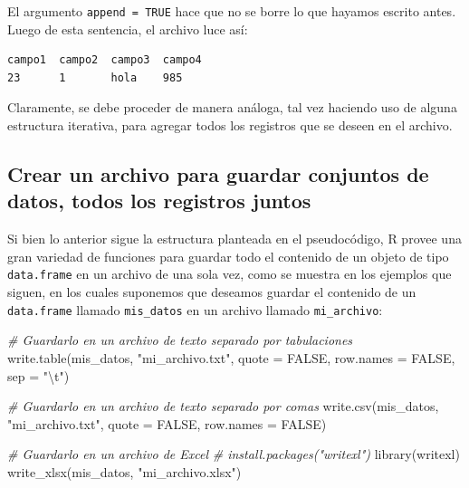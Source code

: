 \documentclass[
]{book}
\newenvironment{Shaded}{\begin{snugshade}}{\end{snugshade}}
\newcommand{\AttributeTok}[1]{\textcolor[rgb]{0.77,0.63,0.00}{#1}}
\newcommand{\CommentTok}[1]{\textcolor[rgb]{0.56,0.35,0.01}{\textit{#1}}}
\newcommand{\ConstantTok}[1]{\textcolor[rgb]{0.00,0.00,0.00}{#1}}
\newcommand{\FunctionTok}[1]{\textcolor[rgb]{0.00,0.00,0.00}{#1}}
\newcommand{\NormalTok}[1]{#1}
\newcommand{\SpecialCharTok}[1]{\textcolor[rgb]{0.00,0.00,0.00}{#1}}
\newcommand{\StringTok}[1]{\textcolor[rgb]{0.31,0.60,0.02}{#1}}
\begin{document}
El argumento \texttt{append\ =\ TRUE} hace que no se borre lo que hayamos escrito antes. Luego de esta sentencia, el archivo luce así:

\begin{verbatim}
campo1  campo2  campo3  campo4
23      1       hola    985 
\end{verbatim}

Claramente, se debe proceder de manera análoga, tal vez haciendo uso de alguna estructura iterativa, para agregar todos los registros que se deseen en el archivo.

\hypertarget{crear-un-archivo-para-guardar-conjuntos-de-datos-todos-los-registros-juntos}{%
\subsection{Crear un archivo para guardar conjuntos de datos, todos los registros juntos}\label{crear-un-archivo-para-guardar-conjuntos-de-datos-todos-los-registros-juntos}}

Si bien lo anterior sigue la estructura planteada en el pseudocódigo, R provee una gran variedad de funciones para guardar todo el contenido de un objeto de tipo \texttt{data.frame} en un archivo de una sola vez, como se muestra en los ejemplos que siguen, en los cuales suponemos que deseamos guardar el contenido de un \texttt{data.frame} llamado \texttt{mis\_datos} en un archivo llamado \texttt{mi\_archivo}:

\begin{Shaded}
\begin{Highlighting}[]
\CommentTok{\# Guardarlo en un archivo de texto separado por tabulaciones}
\FunctionTok{write.table}\NormalTok{(mis\_datos, }\StringTok{"mi\_archivo.txt"}\NormalTok{, }\AttributeTok{quote =} \ConstantTok{FALSE}\NormalTok{, }\AttributeTok{row.names =} \ConstantTok{FALSE}\NormalTok{, }\AttributeTok{sep =} \StringTok{"}\SpecialCharTok{\textbackslash{}t}\StringTok{"}\NormalTok{)}

\CommentTok{\# Guardarlo en un archivo de texto separado por comas}
\FunctionTok{write.csv}\NormalTok{(mis\_datos, }\StringTok{"mi\_archivo.txt"}\NormalTok{, }\AttributeTok{quote =} \ConstantTok{FALSE}\NormalTok{, }\AttributeTok{row.names =} \ConstantTok{FALSE}\NormalTok{)}

\CommentTok{\# Guardarlo en un archivo de Excel}
\CommentTok{\# install.packages("writexl")}
\FunctionTok{library}\NormalTok{(writexl)}
\FunctionTok{write\_xlsx}\NormalTok{(mis\_datos, }\StringTok{"mi\_archivo.xlsx"}\NormalTok{)}
\end{Highlighting}
\end{Shaded}
\end{document}
